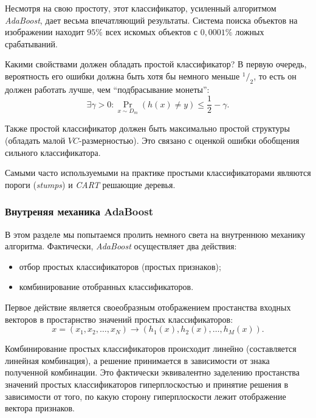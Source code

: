 Несмотря на свою простоту, этот классификатор, усиленный алгоритмом \emph{AdaBoost}, дает весьма впечатляющий результаты. Система поиска объектов на изображении \cite{viola01} находит $95\%$ всех искомых объектов с $0,0001\%$ ложных срабатываний.

Какими свойствами должен обладать простой классификатор? В первую очередь, вероятность его ошибки должна быть хотя бы немного меньше $^1/_2$, то есть он должен работать лучше, чем ``подбрасывание монеты'':
\begin{displaymath}
  \exists \gamma > 0: \underset{x \sim D_m}{\Pr}(h(x) \neq y) \leq \frac{1}{2} - \gamma.
\end{displaymath}

Также простой классификатор должен быть максимально простой структуры (обладать малой $VC$-размерностью). Это связано с оценкой ошибки обобщения сильного классификатора.

Самыми часто используемыми на практике простыми классификаторами являются пороги (\emph{stumps}) и \emph{CART} решающие деревья.

\subsubsection{Внутреняя механика AdaBoost}

В этом разделе мы попытаемся пролить немного света на внутреннюю механику алгоритма. Фактически, \emph{AdaBoost} осуществляет два действия:
\begin{itemize}
  \item отбор простых классификаторов (простых признаков);
  \item комбинирование отобранных классификаторов.
\end{itemize}

Первое действие является своеобразным отображением простанства входных векторов в простарнство значений простых классификаторов:
\begin{displaymath}
  x = (x_1, x_2, \dots, x_N) \to (h_1(x), h_2(x), \dots, h_M(x)).
\end{displaymath}

Комбинирование простых классификаторов происходит линейно (составляется линейная комбинация), а решение принимается в зависимости от знака полученной комбинации. Это фактически эквивалентно заделению простанства значений простых классификаторов гиперплоскостью и принятие решения в зависимости от того, по какую сторону гиперплоскости лежит отображение вектора признаков.

